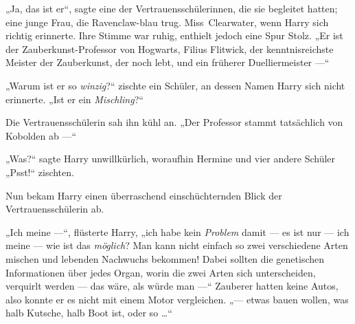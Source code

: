 „Ja, das ist er“, sagte eine der Vertrauensschülerinnen, die sie begleitet hatten; eine junge Frau, die Ravenclaw-blau trug. Miss~Clearwater, wenn Harry sich richtig erinnerte. Ihre Stimme war ruhig, enthielt jedoch eine Spur Stolz.
„Er ist der Zauberkunst-Professor von Hogwarts, Filius Flitwick, der kenntnisreichste Meister der Zauberkunst, der noch lebt, und ein früherer Duelliermeister —“




„Warum ist er so \emph{winzig}?“ zischte ein Schüler, an dessen Namen Harry sich nicht erinnerte.
„Ist er ein \emph{Mischling}?“

Die Vertrauensschülerin sah ihn kühl an.
„Der Professor stammt tatsächlich von Kobolden ab —“

„Was?“ sagte Harry unwillkürlich, woraufhin Hermine und vier andere Schüler
„Psst!“ zischten.

Nun bekam Harry einen überraschend einschüchternden Blick der Vertrauensschülerin ab.

„Ich meine —“, flüsterte Harry, „ich habe kein \emph{Problem} damit — es ist nur — ich meine — wie ist das \emph{möglich}? Man kann nicht einfach so zwei verschiedene Arten mischen und lebenden Nachwuchs bekommen! Dabei sollten die genetischen Informationen über jedes Organ, worin die zwei Arten sich unterscheiden, verquirlt werden — das wäre, als würde man —“ Zauberer hatten keine Autos, also konnte er es nicht mit einem Motor vergleichen. „— etwas bauen wollen, was halb Kutsche, halb Boot ist, oder so …“

